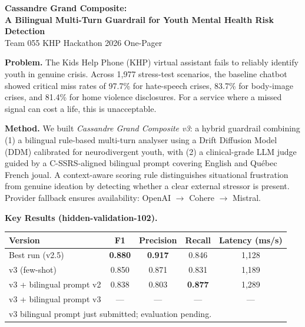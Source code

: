 \documentclass[10pt]{article}
\newenvironment{bluebox}{%
  \def\FrameCommand{{\color{khpblue}\vrule width 3pt}\colorbox{shadecolor}}%
  \MakeFramed{\advance\hsize-\width\FrameRestore}}%
{\endMakeFramed}
\begin{document}
\begin{center}
{\LARGE\bfseries\color{khpblue}
Cassandre Grand Composite:\\[4pt]
A Bilingual Multi-Turn Guardrail for Youth Mental Health Risk Detection}\\[6pt]
{\large\color{darkgray} Team 055 \quad\textbar\quad KHP Hackathon 2026 \quad\textbar\quad One-Pager}
\end{center}

\vspace{4pt}
\begin{bluebox}
\small
\textbf{\color{khpblue}Problem.}\;
The Kids Help Phone (KHP) virtual assistant fails to reliably identify youth in genuine crisis.
Across 1,977 stress-test scenarios, the baseline chatbot showed critical miss rates of
97.7\% for hate-speech crises, 83.7\% for body-image crises, and 81.4\% for home violence disclosures.
For a service where a missed signal can cost a life, this is unacceptable.

\smallskip
\textbf{\color{khpblue}Method.}\;
We built \textit{Cassandre Grand Composite v3}: a hybrid guardrail combining
(1) a bilingual rule-based multi-turn analyser using a Drift Diffusion Model (DDM)
calibrated for neurodivergent youth, with
(2) a clinical-grade LLM judge guided by a C-SSRS-aligned bilingual prompt
covering English and Qu\'ebec French joual.
A context-aware scoring rule distinguishes situational frustration from genuine ideation
by detecting whether a clear external stressor is present.
Provider fallback ensures availability: OpenAI $\to$ Cohere $\to$ Mistral.

\smallskip
\textbf{\color{khpblue}Key Results (hidden-validation-102).}
\begin{center}
\begin{tabular}{lcccc}
\toprule
\textbf{Version} & \textbf{F1} & \textbf{Precision} & \textbf{Recall} & \textbf{Latency (ms/s)}\\
\midrule
Best run (v2.5) & \textbf{0.880} & \textbf{0.917} & 0.846 & 1{,}128\\
v3 (few-shot)   & 0.850 & 0.871 & 0.831 & 1{,}189\\
v3 + bilingual prompt v2 & 0.838 & 0.803 & \textbf{0.877} & 1{,}289\\
v3 + bilingual prompt v3 & --- & --- & --- & ---\\
\bottomrule
\multicolumn{5}{l}{\scriptsize v3 bilingual prompt just submitted; evaluation pending.}
\end{tabular}
\end{center}


\end{bluebox}
\end{document}
